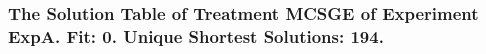  \begin{frame}
 \fontsize{8pt}{9pt}\selectfont
 \frametitle{ The Solution Table of Treatment MCSGE of Experiment ExpA. Fit: 0. Unique Shortest Solutions: 194. }

 \label{ExpASolutionTable000.tex}  
 \end{frame}


